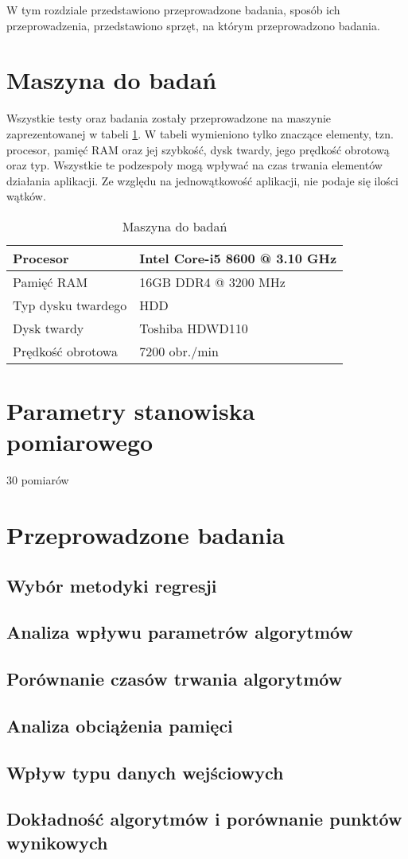 W tym rozdziale przedstawiono przeprowadzone badania, sposób ich przeprowadzenia, przedstawiono sprzęt, na którym przeprowadzono badania.
\section{Maszyna do badań}
Wszystkie testy oraz badania zostały przeprowadzone na maszynie zaprezentowanej w tabeli \ref{tab:machine}. W tabeli wymieniono tylko znaczące elementy, tzn. procesor, pamięć RAM oraz jej szybkość, dysk twardy, jego prędkość obrotową oraz typ. Wszystkie te podzespoły mogą wpływać na czas trwania elementów działania aplikacji. Ze względu na jednowątkowość aplikacji, nie podaje się ilości wątków.
\begin{table}[H]
    \centering
    \begin{tabular}{|l|l|}
    \hline
    Procesor       & Intel Core-i5 8600 @ 3.10 GHz          \\ \hline
    Pamięć RAM     & 16GB DDR4 @ 3200 MHz \\ \hline
    Typ dysku twardego           & HDD              \\ \hline
    Dysk twardy         & Toshiba HDWD110              \\ \hline
    Prędkość obrotowa         & 7200 obr./min              \\ \hline
    \end{tabular}
    \caption{Maszyna do badań}
    \label{tab:machine}
\end{table}
\section{Parametry stanowiska pomiarowego}
30 pomiarów
\section{Przeprowadzone badania}
\subsection{Wybór metodyki regresji}
\label{ssec:regression}
\subsection{Analiza wpływu parametrów algorytmów}
\label{ssec:queryparameters}
\subsection{Porównanie czasów trwania algorytmów}
\label{ssec:times}
\subsection{Analiza obciążenia pamięci}
\label{ssec:memory}
\subsection{Wpływ typu danych wejściowych}
\label{ssec:entrydata}
\subsection{Dokładność algorytmów i porównanie punktów wynikowych}